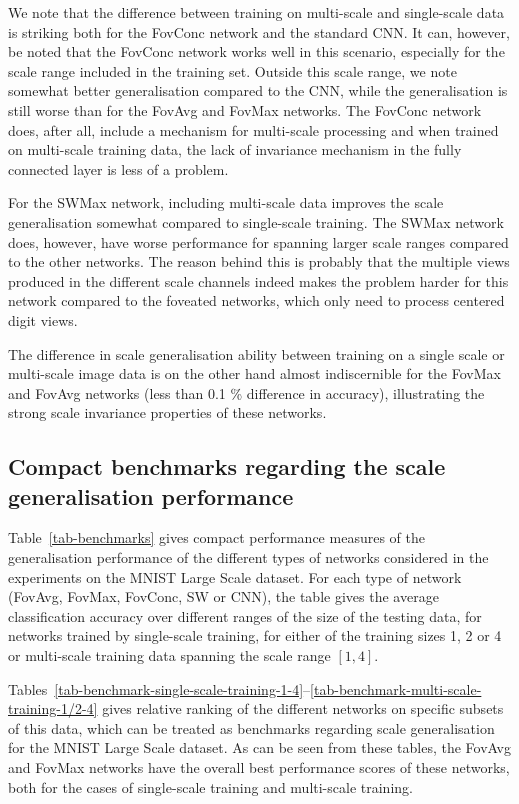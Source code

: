 \documentclass[twocolumn,runningheads]{svjour3}
\begin{document}
We note that the difference between training on multi-scale and single-scale data
is striking both for the FovConc network and the standard CNN. It can,
however, be noted that the FovConc network works well in this
scenario, especially for the scale range included in the training
set. Outside this scale range, we note somewhat better generalisation
compared to the CNN, while the generalisation is still worse than for the FovAvg and FovMax networks. The FovConc network does, after all, include a mechanism for
multi-scale processing and when trained on multi-scale training data,
the lack of invariance mechanism in the fully connected layer is less
of a problem.

For the SWMax network, including multi-scale data improves
the scale generalisation somewhat compared to single-scale training.
The SWMax network does, however, have worse performance for spanning larger scale ranges compared
to the other networks. The reason behind this is probably that the
multiple views produced in the different scale channels
indeed makes the problem harder for this network compared to the
foveated networks, which only need to process centered digit views.
 
The difference in scale generalisation ability between training on a single
scale or multi-scale image data is on the other hand almost indiscernible for the FovMax
and FovAvg networks (less than 0.1 \% difference in accuracy), illustrating the strong scale invariance properties of these networks.

\subsection{Compact benchmarks regarding the scale generalisation performance}

Table~\ref{tab-benchmarks} gives compact performance
measures of the generalisation performance of the different types of
networks considered in the experiments on the MNIST Large Scale
dataset.
For each type of network (FovAvg, FovMax, FovConc, SW or CNN), the
table gives the average classification accuracy over different ranges
of the size of the testing data, for networks trained by single-scale
training, for either of the training sizes
1, 2 or 4 or multi-scale training data spanning the
scale range $[1, 4]$.

Tables~\ref{tab-benchmark-single-scale-training-1-4}--\ref{tab-benchmark-multi-scale-training-1/2-4}
gives relative
  ranking of the different networks on specific subsets of this data,
  which can be treated as benchmarks regarding scale generalisation
  for the MNIST Large Scale dataset.
  As can be seen from these tables, the FovAvg and FovMax networks
  have the overall best performance scores of these networks, both for
  the cases of single-scale training and multi-scale training.
  
\end{document}
